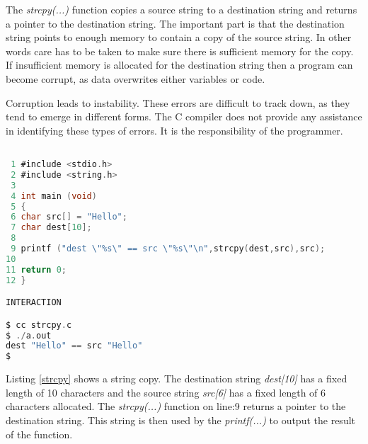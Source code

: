
The \textit{strcpy(...)} function copies a source string to a destination string and returns a pointer to the destination string. The important part is that the destination string points to enough memory to contain a copy of the source string. In other words care has to be taken to make sure there is sufficient memory for the copy. If insufficient memory is allocated for the destination string then a program can become corrupt, as data overwrites either variables or code.  

Corruption leads to instability. These errors are difficult to track down, as they tend to emerge in different forms. The C compiler does not provide any assistance in identifying these types of errors. It is the responsibility of the programmer.  

\begin{lstlisting}[language=C,showstringspaces=false,caption={File: strcpy.c},captionpos=b,label=strcpy]

 1 #include <stdio.h>
 2 #include <string.h>
 3   
 4 int main (void)
 5 {
 6 char src[] = "Hello";
 7 char dest[10];
 8   
 9 printf ("dest \"%s\" == src \"%s\"\n",strcpy(dest,src),src);
10 
11 return 0;
12 }

INTERACTION

$ cc strcpy.c
$ ./a.out
dest "Hello" == src "Hello"
$

\end{lstlisting}

Listing \ref{strcpy} shows a string copy. The destination string \textit{dest[10]} has a fixed length of 10 characters and the source string \textit{src[6]} has a fixed length of 6 characters allocated. The \textit{strcpy(...)} function on line:9 returns a pointer to the destination string. This string is then used  by the \textit{printf(...)} to output the result of the function.
  
 
